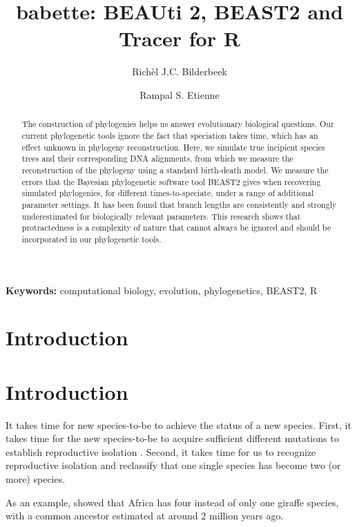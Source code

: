 \documentclass{article}
\title{babette: BEAUti 2, BEAST2 and Tracer for R}
\author[1]{Rich\`el J.C. Bilderbeek}
\author[1]{Rampal S. Etienne}
\affil[1]{Groningen Institute for Evolutionary Life Sciences, University of Groningen, Groningen, The Netherlands}
\begin{document}
\maketitle

\begin{abstract}

  The construction of phylogenies helps us answer evolutionary biological
  questions.
  Our current phylogenetic tools ignore the fact that speciation takes time,
  which has an effect unknown in phylogeny reconstruction.
  Here, we simulate true incipient species trees and their corresponding
  DNA alignments, from which we measure the reconstruction of the phylogeny
  using a standard birth-death model.
  We measure the errors that the Bayesian phylogenetic software tool BEAST2
  gives when recovering simulated phylogenies, for different times-to-speciate,
  under a range of additional parameter settings.
  It has been found that branch lengths are consistently and strongly 
  underestimated for biologically relevant parameters.
  This research shows that protractedness is a complexity of nature that
  cannot always be ignored and should be incorporated in our phylogenetic
  tools.

\end{abstract}

{\bf Keywords:} computational biology, evolution, phylogenetics, BEAST2, R

\section{Introduction}

\section{Introduction}


It takes time for new species-to-be to achieve the status of a new species.
First, it takes time for the new species-to-be 
to acquire sufficient different mutations to 
establish reproductive isolation \cite{schluter2001ecology}. Second, 
it takes time for us to recognize reproductive isolation
and reclassify that one single species has become two 
(or more) species. 


As an example, \cite{fennessy2016multi} 
showed that Africa has four instead of only one
giraffe species, with a common ancestor estimated 
at around 2 million years ago.
\end{document}

